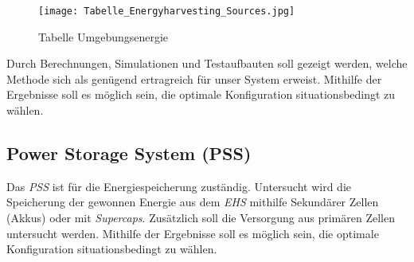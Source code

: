 \begin{figure}[h]
	\centering
	\texttt{[image: Tabelle\_Energyharvesting\_Sources.jpg]}
	\caption{Tabelle Umgebungsenergie \cite{tran_rf_2017}}
	\label{img:Tabelle_Energyharvesting_Sources}
\end{figure} 

Durch Berechnungen, Simulationen und Testaufbauten soll gezeigt werden, welche Methode sich als genügend ertragreich für unser System erweist. Mithilfe der Ergebnisse soll es möglich sein, die optimale Konfiguration situationsbedingt zu wählen. 

\subsection{Power Storage System (PSS)}\label{subsec:PSS}

Das \textit{PSS} ist für die Energiespeicherung zuständig. Untersucht wird die Speicherung der gewonnen Energie aus dem \textit{EHS} mithilfe Sekundärer Zellen (Akkus) oder mit \textit{Supercaps}. Zusätzlich soll die Versorgung aus primären Zellen untersucht werden. Mithilfe der Ergebnisse soll es möglich sein, die optimale Konfiguration situationsbedingt zu wählen.   
  